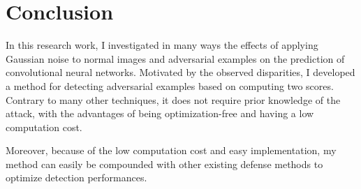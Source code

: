 \chapter{Conclusion}
\label{conclusion}
\overridetextsize

In this research work, I investigated in many ways the effects of applying
Gaussian noise to normal images and adversarial examples on the prediction of
convolutional neural networks. Motivated by the observed disparities, I
developed a method for detecting adversarial examples based on computing two
scores. Contrary to many other techniques, it does not require prior knowledge
of the attack, with the advantages of being optimization-free and having a low
computation cost.

Moreover, because of the low computation cost and easy implementation, my method
can easily be compounded with other existing defense methods to optimize
detection performances.